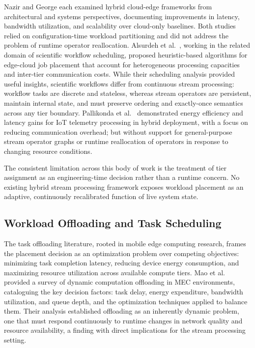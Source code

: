\documentclass[preprint,review,12pt]{elsarticle}
\begin{document}
Nazir \cite{nazir2022hybrid} and George \cite{george2022hybrid} each examined hybrid cloud-edge frameworks from architectural and systems perspectives, documenting improvements in latency, bandwidth utilization, and scalability over cloud-only baselines. Both studies relied on configuration-time workload partitioning and did not address the problem of runtime operator reallocation. Alsurdeh et al.~\cite{alsurdeh2021hybrid}, working in the related domain of scientific workflow scheduling, proposed heuristic-based algorithms for edge-cloud job placement that account for heterogeneous processing capacities and inter-tier communication costs. While their scheduling analysis provided useful insights, scientific workflows differ from continuous stream processing: workflow tasks are discrete and stateless, whereas stream operators are persistent, maintain internal state, and must preserve ordering and exactly-once semantics across any tier boundary. Pallikonda et al.~\cite{pallikonda2025iot} demonstrated energy efficiency and latency gains for IoT telemetry processing in hybrid deployment, with a focus on reducing communication overhead; but without support for general-purpose stream operator graphs or runtime reallocation of operators in response to changing resource conditions.

The consistent limitation across this body of work is the treatment of tier assignment as an engineering-time decision rather than a runtime concern. No existing hybrid stream processing framework exposes workload placement as an adaptive, continuously recalibrated function of live system state.

\subsection{Workload Offloading and Task Scheduling}\label{workload-offloading-and-task-scheduling}

The task offloading literature, rooted in mobile edge computing research, frames the placement decision as an optimization problem over competing objectives: minimizing task completion latency, reducing device energy consumption, and maximizing resource utilization across available compute tiers. Mao et al.~\cite{mao2017offloading} provided a survey of dynamic computation offloading in MEC environments, cataloguing the key decision factors: task delay, energy expenditure, bandwidth utilization, and queue depth, and the optimization techniques applied to balance them. Their analysis established offloading as an inherently dynamic problem, one that must respond continuously to runtime changes in network quality and resource availability, a finding with direct implications for the stream processing setting.
\end{document}
